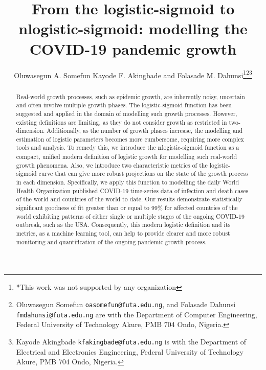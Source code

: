 \documentclass[journal]{IEEEtran}
\theoremstyle{plain}
\theoremstyle{definition}
\theoremstyle{remark}
\begin{document}
\title{From the logistic-sigmoid to \textbf{n}logistic-sigmoid: modelling the COVID-19 pandemic growth}
\author{Oluwasegun A. Somefun Kayode F. Akingbade and Folasade M. Dahunsi\thanks{*This work was not supported by any organization}\thanks{Oluwasegun Somefun {\tt\footnotesize oasomefun@futa.edu.ng}, and Folasade Dahunsi  {\tt\footnotesize  fmdahunsi@futa.edu.ng} are with the Department of Computer Engineering, Federal University of Technology Akure, PMB 704 Ondo, Nigeria.
}\thanks{Kayode Akingbade {\tt\footnotesize kfakingbade@futa.edu.ng} is with the Department of Electrical and Electronics Engineering, Federal University of Technology Akure, PMB 704 Ondo, Nigeria.
}}


\maketitle



\begin{abstract}
Real-world growth processes, such as epidemic growth, are inherently noisy, uncertain and often involve multiple growth phases. The logistic-sigmoid function has been suggested and applied in the domain of modelling such growth processes. However, existing definitions are limiting, as they do not consider growth as restricted in two-dimension. Additionally, as the number of growth phases increase, the modelling and estimation of logistic parameters becomes more cumbersome, requiring more complex tools and analysis. To remedy this, we introduce the \textbf{n}logistic-sigmoid function as a compact, unified modern definition of logistic growth for modelling such real-world growth phenomena. Also, we introduce two characteristic metrics of the logistic-sigmoid curve that can give more robust projections on the state of the growth process in each dimension.  Specifically, we apply this function to modelling the daily World Health Organization published COVID-19 time-series data of infection and death cases of the world and countries of the world to date. Our results demonstrate statistically significant goodness of fit greater than or equal  to 99\% for affected countries of the world exhibiting patterns of either single or multiple stages of the ongoing COVID-19 outbreak, such as the USA. Consequently, this modern logistic definition and its metrics, as a machine learning tool, can help to provide clearer and more robust monitoring and quantification of the ongoing pandemic growth process.
\end{abstract}
\end{document}
